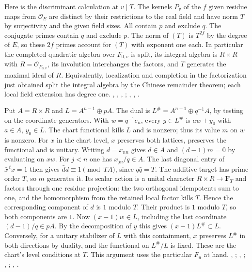 Here is the discriminant calculation at $v\mid T$. The kernels $P_v$ of
the $f$ given residue maps from $\mathcal O_E$ are distinct by their
restrictions to the real field and have norm $T$ by surjectivity and
the given field sizes. All contain $p$ and exclude $q$.
The conjugate primes contain $q$ and exclude $p$. The norm of $(T)$ is
$T^{2f}$ by the degree of $E$, so these $2f$ primes account for $(T)$
with exponent one each. In particular the completed quadratic algebra
over $F_{0,v}$ is split, its integral algebra is $R\times R$ with
$R=\mathcal O_{F_{0,v}}$, its involution interchanges the factors, and
$T$ generates the maximal ideal of $R$. Equivalently, localization and
completion in the factorization just obtained split the integral algebra
by the Chinese remainder theorem; each local field extension has degree
one. , , ,
;
, ,
.

Put $A=R\times R$ and $L=A^{n-1}\oplus pA$.
The dual is $L^\#=A^{n-1}\oplus q^{-1}A$, by testing on the coordinate
generators. With $w=q^{-1}e_n$, every $y\in L^\#$ is $aw+y_0$ with
$a\in A$, $y_0\in L$. The chart functional kills $L$ and is nonzero;
thus its value $m$ on $w$ is nonzero. For $x$ in the chart level,
$x$ preserves both lattices, preserves the functional and is unitary.
Writing $d=x_{nn}$ gives $d\in A$ and $(d-1)m=0$ by evaluating on $xw$.
For $j<n$ one has $x_{jn}/q\in A$. The last diagonal entry of
$\bar x^{\,t}x=1$ then gives $\bar d d\equiv1\pmod{TA}$, since
$q\bar q=T$. The additive target has prime order $T$, so $m$ generates
it. Its scalar action is a unital character
$R\times R\longrightarrow\mathbf F_T$ and factors through one residue
projection: the two orthogonal idempotents sum to one, and the
homomorphism from the retained local factor kills $T$. Hence the
corresponding component of $d$ is $1$ modulo $T$. Their product is
$1$ modulo $T$, so both components are $1$. Now $(x-1)w\in L$, including
the last coordinate $(d-1)/q\in pA$. By the decomposition of $y$ this
gives $(x-1)L^\#\subset L$. Conversely, for a unitary stabilizer of
$L$ with this containment, $x$ preserves $L^\#$ in both directions
by duality, and the functional on $L^\#/L$ is fixed. These are the chart's
level conditions at $T$. This argument uses the particular $F_u$ at hand.
, ;
,
;
, ;
, .

